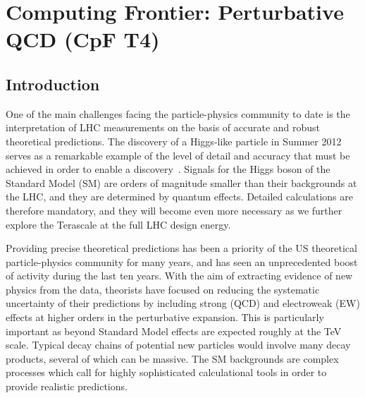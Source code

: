 

\chapter{Computing Frontier: Perturbative QCD (CpF T4)}
\label{chap:T4}


\begin{center}\begin{boldmath}



\end{boldmath}\end{center}




\section{Introduction}

One of the main challenges facing the particle-physics community to date
is the interpretation of LHC measurements on the basis of accurate and
robust theoretical predictions.  The discovery of a Higgs-like
particle in Summer 2012~\cite{Aad:2012tfa,Chatrchyan:2012ufa} serves
as a remarkable example of the level of detail and accuracy that must
be achieved in order to enable a
discovery~\cite{Dittmaier:2011ti,Dittmaier:2012vm,Heinemeyer:2013tqa}.
Signals for the Higgs boson of the Standard Model (SM) are orders of 
magnitude smaller than their backgrounds at the LHC, and they are 
determined by quantum effects.  Detailed calculations are therefore 
mandatory, and they will become even more necessary as we further 
explore the Terascale at the full LHC design energy.

Providing precise theoretical predictions has been a priority of the US 
theoretical particle-physics community for many years, and has seen an
unprecedented boost of activity during the last ten years. With the
aim of extracting evidence of new physics from the data, theorists
have focused on reducing the systematic uncertainty of their predictions
by including strong (QCD) and electroweak (EW) effects at higher orders
in the perturbative expansion. This is particularly important as
beyond Standard Model effects are expected roughly at the TeV scale. 
Typical decay chains of potential new particles would involve many 
decay products, several of which can be massive. The SM backgrounds 
are complex processes which call for highly sophisticated calculational 
tools in order to provide realistic predictions.

